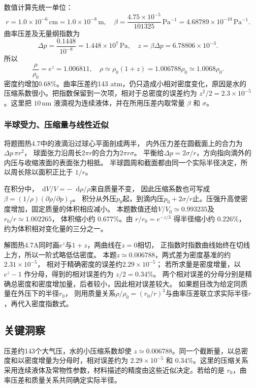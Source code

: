 \documentclass[UTF8,fontset=fandol,a4paper,11pt]{ctexart}
\newcommand{\dd}{\mathop{}\!\mathrm{d}}
\begin{document}
数值计算先统一单位：
\[
r=1.0\times10^{-6}\,\mathrm{cm}=1.0\times10^{-8}\,\mathrm m,
\quad \beta=\frac{4.75\times10^{-5}}{101325}\,\mathrm{Pa^{-1}}
=4.68789\times10^{-10}\,\mathrm{Pa^{-1}}.
\]
曲率压差及无量纲指数为
\[
\Delta p=\frac{0.1448}{10^{-8}}=1.448\times10^7\,\mathrm{Pa},
\quad z=\beta\Delta p=6.78806\times10^{-3}.
\]
所以
\[
\frac{\rho}{\rho_0}=e^z=1.006811,
\quad \rho\simeq\rho_0(1+z)=1.006788\rho_0\simeq1.0068\rho_0.
\]
密度约增加0.68\%。曲率压差约143 atm，仍只造成小相对密度变化，原因是水的压缩系数很小。把指数保留到一次项，相对于总密度的误差约为 $z^2/2=2.3\times10^{-5}$。这里把 $10\,\mathrm{nm}$ 液滴视为连续液体，并在所用压差内取常量 $\beta$ 和 $\sigma$。
\subsubsection*{半球受力、压缩量与线性近似}
将题图热4.7中的液滴沿过球心平面剖成两半，
内外压力差在圆截面上的合力为$\Delta p\,\pi r^2$，
球面张力沿周长$2\pi r$的合力为$2\pi r\sigma$。
平衡给$\Delta p=2\sigma/r$，方向指向滴外的内压与收缩液面的表面张力相抵。
半球圆周和截面都由同一个实际半径决定，所以周长除以面积正比于 $1/r$。

在积分中，$\dd V/V=-\dd\rho/\rho$来自质量不变，
因此压缩系数也可写成$\beta=(1/\rho)(\partial\rho/\partial p)_T$。
积分从外压$p_0$起，到滴内压$p_0+2\sigma/r$止。压强升高使密度增加，固定质量的体积相应减小。
本题数值还给$V/V_0\simeq0.993235$及$r_0/r\simeq1.002265$，
体积缩小约 $0.677\%$。由 $r/r_0=e^{-z/3}$ 得半径缩小约 $0.226\%$，约为体积相对变化量的三分之一。

解图热4.7A同时画$e^z$与$1+z$，两曲线在$z=0$相切，
正指数时指数曲线始终在切线上方，所以一阶式略低估密度。
本题$z\simeq0.006788$，两式差为密度基准的约$2.31\times10^{-5}$，
相对于精确密度的误差约$2.29\times10^{-5}$；
若所求量是密度增量，以 $e^z-1$ 作分母，得到的相对误差约为 $z/2=0.34\%$。
两个相对误差的分母分别是精确总密度和密度增加量，后者较小，因此相对误差较大。
如果题目改为给定同质量在外压下的半径$r_0$，
则用质量关系$\rho/\rho_0=(r_0/r)^3$与曲率压差联立求实际半径$r$，再代入密度指数式。




\subsection*{关键洞察}

压差约143个大气压，水的小压缩系数却使 $z\simeq0.006788$。同一个截断量，以总密度和以密度增量为分母时，相对误差约为 $2.29\times10^{-5}$ 和 $0.34\%$。这里的压缩关系采用连续液体及常物性参数，材料描述的精度由这些近似决定。若给的是 $r_0$，曲率压差和质量关系共同确定实际半径。
\end{document}
